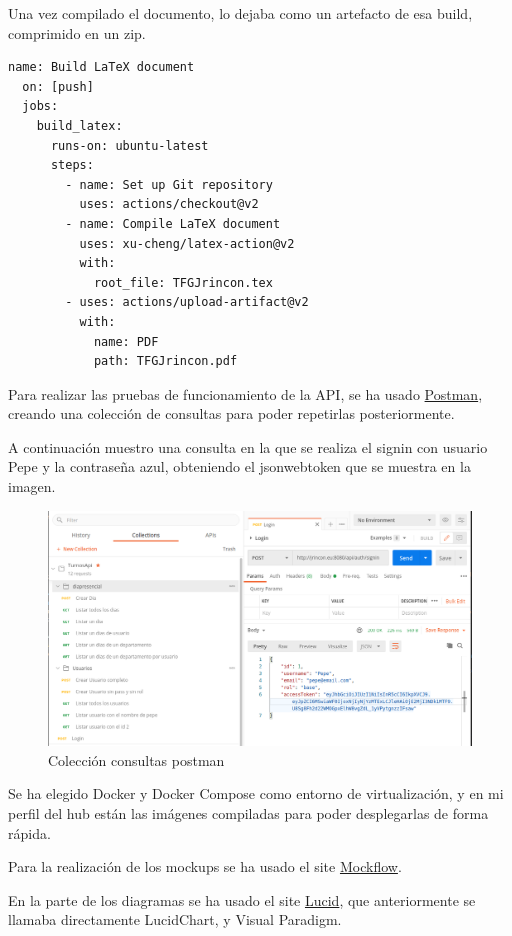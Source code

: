 \documentclass[11pt,spanish,listoffigures,listoftables]{tfgetsinf}
\begin{document}
Una vez compilado el documento, lo dejaba como un artefacto de esa build, comprimido en un zip. 

\begin{lstlisting}[style=ES6, caption={Configuración action github}]
  name: Build LaTeX document
  on: [push]
  jobs:
    build_latex:
      runs-on: ubuntu-latest
      steps:
        - name: Set up Git repository
          uses: actions/checkout@v2
        - name: Compile LaTeX document
          uses: xu-cheng/latex-action@v2
          with:
            root_file: TFGJrincon.tex
        - uses: actions/upload-artifact@v2
          with:
            name: PDF
            path: TFGJrincon.pdf
\end{lstlisting}
\clearpage
Para realizar las pruebas de funcionamiento de la API, se ha usado \href{https://www.postman.com/}{Postman}, creando una colección de consultas para poder repetirlas posteriormente.

A continuación muestro una consulta en la que se realiza el signin con usuario Pepe y la contraseña azul, obteniendo el jsonwebtoken que se muestra en la imagen.

\begin{figure}[h!] %
  \centering
   \includegraphics[width=\linewidth]{img/postman.png}
   \caption{Colección consultas postman}
   \label{fig:postman}
 \end{figure}

Se ha elegido Docker y Docker Compose como entorno de virtualización, y en mi perfil del hub están las imágenes compiladas para poder desplegarlas de forma rápida. 

Para la realización de los mockups se ha usado el site \href{https://mockflow.com/app/#Wireframe}{Mockflow}.

En la parte de los diagramas se ha usado el site \href{https://lucid.app/}{Lucid}, que anteriormente se llamaba directamente LucidChart, y Visual Paradigm.
\end{document}
